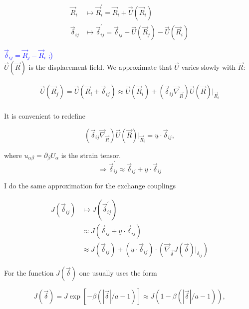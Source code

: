 \documentclass[../../../main.tex]{subfiles}
\begin{document}
\begin{align}
	\vec{R}_i &\mapsto \vec{R}_i^\prime = \vec{R}_i + \vec{U}(\vec{R}_i) \\
	\vec{\delta}_{ij} &\mapsto \vec{\delta}_{ij}^\prime = \vec{\delta}_{ij} + \vec{U}(\vec{R}_j) - \vec{U}(\vec{R}_i)
\end{align}

\textcolor{blue}{$\vec{\delta}_{ij} = \vec{R}_j-\vec{R}_i$ ;)} \\

$\vec{U}(\vec{R})$ is the displacement field. We approximate that $\vec{U}$ varies slowly with $\vec{R}$:

\begin{gather}
	\vec{U}(\vec{R}_j) = \vec{U}(\vec{R}_i + \vec{\delta}_{ij}) \approx \vec{U}(\vec{R}_i) + \left(\vec{\delta}_{ij}\vec{\nabla}_{\vec{R}}\right) \vec{U}(\vec{R}) \big\rvert_{\vec{R}_i} \\
\end{gather}


It is convenient to redefine 

\begin{equation}
	\left( \vec{\delta}_{ij} \vec{\nabla}_{\vec{R}} \right) \vec{U}(\vec{R})\big\rvert_{\vec{R}_i} = \underline{u} \cdot \vec{\delta}_{ij},
\end{equation}

where $u_{\alpha\beta} = \partial_{\beta}U_{\alpha}$ is the strain tensor. \\

\begin{equation}
	\Rightarrow \vec{\delta}_{ij}^\prime \approx \vec{\delta}_{ij} + \underline{u}\cdot\vec{\delta}_{ij} 
\end{equation}

I do the same approximation for the exchange couplings 

\begin{align}
	J(\vec{\delta}_{ij}) &\mapsto J(\vec{\delta}_{ij}^\prime) \\
	&\approx J\left(\vec{\delta}_{ij} + \underline{u}\cdot\vec{\delta}_{ij}\right) \\
	&\approx J(\vec{\delta}_{ij}) + \left(\underline{u}\cdot\vec{\delta}_{ij}\right) \cdot \left( \vec{\nabla}_{\vec{\delta}}J(\vec{\delta})\big\rvert_{\delta_{ij}}\right)
\end{align}

For the function $J(\vec{\delta})$ one usually uses the form

\begin{equation}
	J(\vec{\delta}) = J\exp\left[-\beta\left(|\vec{\delta}|/a-1\right)\right] \approx J\left(1 -\beta\left(|\vec{\delta}|/a-1\right)\right),
\end{equation}
\end{document}
